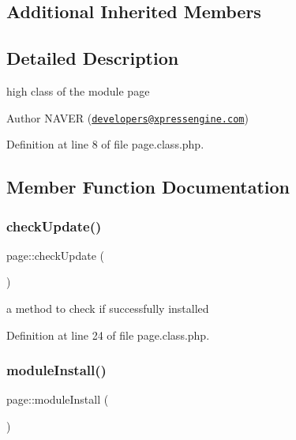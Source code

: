 \subsection*{Additional Inherited Members}


\subsection{Detailed Description}
high class of the module page 

\begin{DoxyAuthor}{Author}
N\+A\+V\+ER (\href{mailto:developers@xpressengine.com}{\tt developers@xpressengine.\+com}) 
\end{DoxyAuthor}


Definition at line 8 of file page.\+class.\+php.



\subsection{Member Function Documentation}
\hypertarget{classpage_ad635ecff86f3837caf39e0a13f714321}{}\label{classpage_ad635ecff86f3837caf39e0a13f714321} 
\subsubsection{\texorpdfstring{check\+Update()}{checkUpdate()}}
{\footnotesize\ttfamily page\+::check\+Update (\begin{DoxyParamCaption}{ }\end{DoxyParamCaption})}



a method to check if successfully installed 



Definition at line 24 of file page.\+class.\+php.

\hypertarget{classpage_ae25169ce6659a05e22c369edcdef2f16}{}\label{classpage_ae25169ce6659a05e22c369edcdef2f16} 
\subsubsection{\texorpdfstring{module\+Install()}{moduleInstall()}}
{\footnotesize\ttfamily page\+::module\+Install (\begin{DoxyParamCaption}{ }\end{DoxyParamCaption})}




